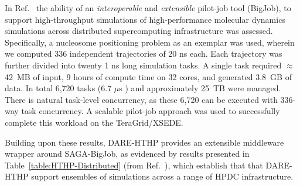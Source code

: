 \documentclass[]{svjour3}
\begin{document}
In Ref.~\cite{bigjob-ccgrid12} the ability of an {\it interoperable}
and {\it extensible} pilot-job tool (BigJob), to support
high-throughput simulations of high-performance molecular dynamics
simulations across distributed supercomputing infrastructure was
assessed.  Specifically, a nucleosome positioning problem as an
exemplar was used, wherein we computed 336 independent trajectories of
20 ns each.  Each trajectory was further divided into twenty 1 ns long
simulation tasks. A single task required $\approx$ 42~MB of input, 9
hours of compute time on 32 cores, and generated 3.8~GB of data.  In
total 6,720 tasks (6.7 $ \mu $s ) and approximately 25~TB were
managed.  There is natural task-level concurrency, as these 6,720 can
be executed with 336-way task concurrency.  A scalable pilot-job
approach was used to successfully complete this workload on the
TeraGrid/XSEDE.


Building upon these results, DARE-HTHP provides an extensible
middleware wrapper around SAGA-BigJob, as evidenced by results
presented in Table~\ref{table:HTHP-Distributed} (from
Ref.~\cite{ccpe11}), which establish that that DARE-HTHP support
ensembles of simulations across a range of HPDC infrastructure.



\end{document}

